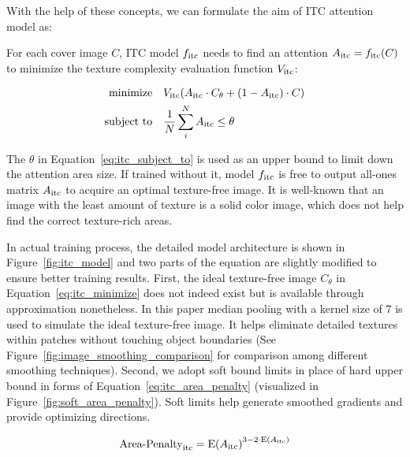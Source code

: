 With the help of these concepts, we can formulate the aim of ITC attention model as:

For each cover image \(C\), ITC model \(f_{\text{itc}}\) needs to find an attention \(A_{\text{itc}} = f_{\text{itc}}(C)\) to minimize the texture complexity evaluation function \(V_{\text{itc}}\):

\begin{align}
  \text{minimize}   \quad & V_{\text{itc}}(A_{\text{itc}} \cdot C_{\theta} + (1 - A_{\text{itc}}) \cdot C)
  \label{eq:itc_minimize}                                                                         \\
  \text{subject to} \quad & \frac{1}{N} \sum_{i}^{N} A_{\text{itc}} \leq \theta \label{eq:itc_subject_to}
\end{align}

The \( \theta \) in Equation~\ref{eq:itc_subject_to} is used as an upper bound to limit down the attention area size. If trained without it, model \(f_{\text{itc}}\) is free to output all-ones matrix \(A_{\text{itc}}\) to acquire an optimal texture-free image. It is well-known that an image with the least amount of texture is a solid color image, which does not help find the correct texture-rich areas.


In actual training process, the detailed model architecture is shown in Figure~\ref{fig:itc_model} and two parts of the equation are slightly modified to ensure better training results. First, the ideal texture-free image \(C_{\theta}\) in Equation~\ref{eq:itc_minimize} does not indeed exist but is available through approximation nonetheless. In this paper median pooling with a kernel size of 7 is used to simulate the ideal texture-free image. It helps eliminate detailed textures within patches without touching object boundaries (See Figure~\ref{fig:image_smoothing_comparison} for comparison among different smoothing techniques). Second, we adopt soft bound limits in place of hard upper bound in forms of Equation~\ref{eq:itc_area_penalty} (visualized in Figure~\ref{fig:soft_area_penalty}). Soft limits help generate smoothed gradients and provide optimizing directions.

\figureImageSmoothingComparison%

\begin{equation}
  \text{Area-Penalty}_{\text{itc}} = {\mathrm{E}(A_{\text{itc}})}^{3-2 \cdot \mathrm{E}(A_{\text{itc}})}
  \label{eq:itc_area_penalty}
\end{equation}

